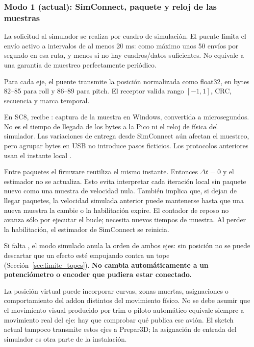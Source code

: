 \subsubsection{Modo 1 (actual): SimConnect, paquete y reloj de las muestras}
La solicitud al simulador se realiza por cuadro de simulación. El puente limita el envío activo a intervalos de al menos 20 ms: como máximo unos 50 envíos por segundo en esa ruta, y menos si no hay cuadros/datos suficientes. No equivale a una garantía de muestreo perfectamente periódico.

Para cada eje, el puente transmite la posición normalizada como float32, en bytes 82--85 para roll y 86--89 para pitch. El receptor valida rango $[-1,1]$, CRC, secuencia y marca temporal.

En SC8,  recibe : captura de la muestra en Windows, convertida a microsegundos. No es el tiempo de llegada de los bytes a la Pico ni el reloj de física del simulador. Las variaciones de entrega desde SimConnect aún afectan el muestreo, pero agrupar bytes en USB no introduce pasos ficticios. Los protocolos anteriores usan el instante local .

Entre paquetes el firmware reutiliza el mismo instante. Entonces $\Delta t=0$ y el estimador no se actualiza. Esto evita interpretar cada iteración local sin paquete nuevo como una muestra de velocidad nula. También implica que, si dejan de llegar paquetes, la velocidad simulada anterior puede mantenerse hasta que una nueva muestra la cambie o la habilitación expire. El contador de reposo no avanza sólo por ejecutar el bucle; necesita nuevos tiempos de muestra. Al perder la habilitación, el estimador de SimConnect se reinicia.

Si falta , el modo simulado anula la orden de ambos ejes: sin posición no se puede descartar que un efecto esté empujando contra un tope (Sección~\ref{sec:limite_topes}). \textbf{No cambia automáticamente a un potenciómetro o encoder que pudiera estar conectado.}

La posición virtual puede incorporar curvas, zonas muertas, asignaciones o comportamiento del addon distintos del movimiento físico. No se debe asumir que el movimiento visual producido por trim o piloto automático equivale siempre a movimiento real del eje: hay que comprobar qué publica ese avión. El sketch actual tampoco transmite estos ejes a Prepar3D; la asignación de entrada del simulador es otra parte de la instalación.

